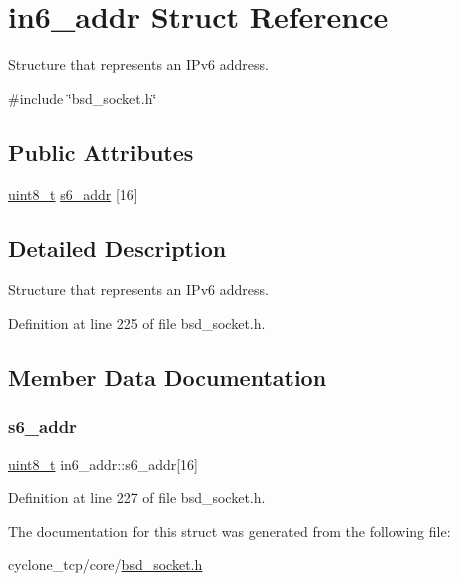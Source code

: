 \hypertarget{structin6__addr}{}\section{in6\+\_\+addr Struct Reference}
\label{structin6__addr}


Structure that represents an I\+Pv6 address.  




{\ttfamily \#include \char`\"{}bsd\+\_\+socket.\+h\char`\"{}}

\subsection*{Public Attributes}
\begin{DoxyCompactItemize}
\item 
\hyperlink{stdint_8h_aba7bc1797add20fe3efdf37ced1182c5}{uint8\+\_\+t} \hyperlink{structin6__addr_aa1d600770ac35faa253a53aecd9b3786}{s6\+\_\+addr} \mbox{[}16\mbox{]}
\end{DoxyCompactItemize}


\subsection{Detailed Description}
Structure that represents an I\+Pv6 address. 

Definition at line 225 of file bsd\+\_\+socket.\+h.



\subsection{Member Data Documentation}
\mbox{\label{structin6__addr_aa1d600770ac35faa253a53aecd9b3786}} 
\subsubsection{\texorpdfstring{s6\+\_\+addr}{s6\_addr}}
{\footnotesize\ttfamily \hyperlink{stdint_8h_aba7bc1797add20fe3efdf37ced1182c5}{uint8\+\_\+t} in6\+\_\+addr\+::s6\+\_\+addr\mbox{[}16\mbox{]}}



Definition at line 227 of file bsd\+\_\+socket.\+h.



The documentation for this struct was generated from the following file\+:\begin{DoxyCompactItemize}
\item 
cyclone\+\_\+tcp/core/\hyperlink{bsd__socket_8h}{bsd\+\_\+socket.\+h}\end{DoxyCompactItemize}
